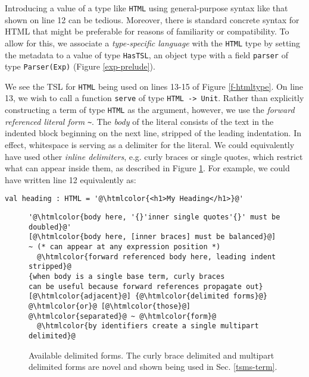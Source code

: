\documentclass{sig-alternate}
\newcommand{\htmlcolor}[1]{\textcolor[HTML]{339933}{#1}}
\newcommand{\mycaption}[1]{\vspace{-4px}\caption{#1}\vspace{-2px}}
\begin{document}
Introducing a value of a type like \verb|HTML| using general-purpose syntax like that shown on line 12 can be tedious. Moreover, there is standard concrete syntax for HTML that might be preferable for reasons of familiarity or compatibility. To allow for this, we associate a \emph{type-specific language} with the \verb|HTML| type by setting the metadata to a value of type \verb|HasTSL|, an object type with a field \verb|parser| of type \verb|Parser(Exp)| (Figure \ref{exp-prelude}). 

We see the TSL for \verb|HTML| being used on lines 13-15 of Figure \ref{f-htmltype}. On line 13, we wish to call a function \verb|serve| of type \verb|HTML -> Unit|. Rather than explicitly constructing a term of type \verb|HTML| as the argument, however, we use the \emph{forward referenced literal form} \lstinline[style=wyvern]{~}. The \emph{body} of the literal consists of the text in the indented block beginning on the next line, stripped of the leading indentation. In effect, whitespace is serving as a delimiter for the literal. We could equivalently have used other \emph{inline delimiters}, e.g. curly braces or single quotes, which restrict what can appear inside them, as described in Figure \ref{f-delimited}. For example, we could have written line 12 equivalently as:
\begin{lstlisting}[style=wyvern, numbers=none, frame=none]
  val heading : HTML = '@\htmlcolor{<h1>My Heading</h1>}@'
\end{lstlisting}

\begin{figure}[t]
\begin{lstlisting}[style=tempwyvern]
'@\htmlcolor{body here, '{}'inner single quotes'{}' must be doubled}@'
[@\htmlcolor{body here, [inner braces] must be balanced}@]
~ (* can appear at any expression position *)
  @\htmlcolor{forward referenced body here, leading indent stripped}@
{when body is a single base term, curly braces
can be useful because forward references propagate out}
[@\htmlcolor{adjacent}@] {@\htmlcolor{delimited forms}@} @\htmlcolor{or}@ [@\htmlcolor{those}@] @\htmlcolor{separated}@ ~ @\htmlcolor{form}@
  @\htmlcolor{by identifiers create a single multipart delimited}@
\end{lstlisting}
\mycaption{Available delimited forms. The curly brace delimited and multipart delimited forms are novel and shown being used in Sec. \ref{tsms-term}. }
\label{f-delimited}
\end{figure}
\end{document}
